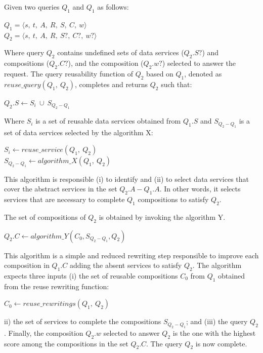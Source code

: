 \begin{definition}
Given two queries $Q_{1}$ and $Q_{1}$ as follows:
\begin{center}
$Q_{1} = \langle s,\ t,\ A,\ R,\ S,\ C,\ w \rangle$ \\
$Q_{2} = \langle s,\ t,\ A,\ R,\ S?,\ C?,\ w? \rangle$
\end{center}
Where query $Q_{2}$ contains undefined sets of data services ($Q_{2}.S?$) and compositions ($Q_{2}.C?$), and the composition ($Q_{2}.w?$) selected to answer the request.
The query reusability function of $Q_{2}$ based on $Q_{1}$, denoted as $reuse\_query(Q_{1},\ Q_{2})$, completes and returns $Q_{2}$ such that:
\begin{center}
$ Q_{2}.S \leftarrow S_{i}\ \cup\ S_{Q_{2}-Q_{1}} $
\end{center}
Where $ S_{i}$ is a set of reusable data services obtained from $Q_{1}.S$ and $S_{Q_{2}-Q_{1}}$ is a set of data services selected by the algorithm X:
\begin{center}
$S_{i} \leftarrow reuse\_service (Q_{1},\ Q_{2})$ \\
$S_{Q_{2}-Q_{1}} \leftarrow algorithm\_X (Q_{1},\ Q_{2})$
\end{center}
This algorithm is responsible (i) to identify and (ii) to select data services that cover the abstract services in the set $Q_{2}.A - Q_{1}.A$. In other words, it selects services that are necessary to complete $Q_{1}$ compositions to satisfy $Q_{2}$.

The set of compositions of $Q_{2}$ is obtained by invoking the algorithm Y.
\begin{center}
$Q_{2}.C \leftarrow algorithm\_Y (C_{0}, S_{Q_{2}-Q_{1}}, Q_{2})$
\end{center}
This algorithm is a simple and reduced rewriting step responsible to improve each composition in $Q_{1}.C$ adding the absent services to satisfy $Q_{2}$. 
The algorithm expects three inputs (i) the set of reusable compositions $C_{0}$ from $Q_{1}$ obtained from the reuse rewriting function: 
\begin{center}
$ C_{0} \leftarrow reuse\_rewritings (Q_{1},\ Q_{2})$
\end{center}
ii) the set of services to complete the compositions $S_{Q_{2}-Q_{1}}$; and (iii) the query  $Q_{2}$.
Finally, the composition $Q_{2}.w$ selected to answer $Q_{2}$ is the one with the highest score among the compositions in the set $Q_{2}.C$. 
The query $Q_{2}$ is now complete.
\end{definition}

